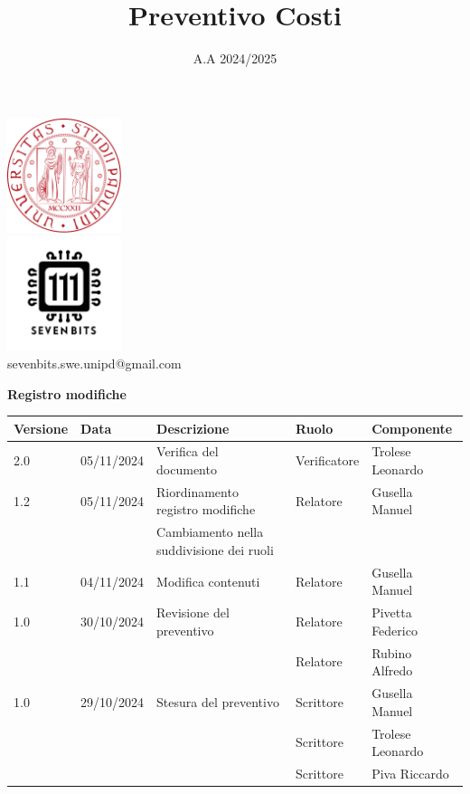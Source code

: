 \documentclass[10pt]{article}
\title{Preventivo Costi}
\date{A.A 2024/2025}
\begin{document}
\maketitle
\begin{center}
\includegraphics[width=0.25\textwidth]{LogoUnipd}\\
\includegraphics[width=0.25\textwidth]{Sevenbitslogo}\\
sevenbits.swe.unipd@gmail.com\\
\vspace{2mm}

\textbf{Registro modifiche}\\
\vspace{2mm}
\begin{tabular}{|l|l|l|l|l|}
\hline
\textbf{Versione} & \textbf{Data} & \textbf{Descrizione} & \textbf{Ruolo} & \textbf{Componente} \\
\hline
2.0 & 05/11/2024 & Verifica del documento & Verificatore & Trolese Leonardo\\
\hline
1.2 & 05/11/2024 & Riordinamento registro modifiche & Relatore & Gusella Manuel\\
& & Cambiamento nella suddivisione dei ruoli& &\\ 
\hline
1.1 & 04/11/2024 & Modifica contenuti & Relatore & Gusella Manuel\\
\hline
1.0 & 30/10/2024 & Revisione del preventivo & Relatore & Pivetta Federico\\
& & & Relatore & Rubino Alfredo\\
\hline
1.0 & 29/10/2024 & Stesura del preventivo & Scrittore & Gusella Manuel\\
& & & Scrittore & Trolese Leonardo\\
& & & Scrittore & Piva Riccardo\\
\hline
\end{tabular}
\end{center}
\newpage
\tableofcontents
\newpage
\end{document}
